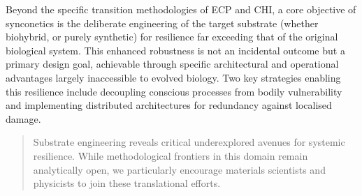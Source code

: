 \documentclass[10pt]{article}
\begin{document}
\begin{sloppypar}
  Beyond the specific transition methodologies of ECP and CHI, a core objective of synconetics is the deliberate engineering of the target substrate (whether biohybrid, or purely synthetic) for resilience far exceeding that of the original biological system. This enhanced robustness is not an incidental outcome but a primary design goal, achievable through specific architectural and operational advantages largely inaccessible to evolved biology. Two key strategies enabling this resilience include decoupling conscious processes from bodily vulnerability and implementing distributed architectures for redundancy against localised damage.


  \begin{quote}
    Substrate engineering reveals critical underexplored avenues for systemic resilience. While methodological frontiers in this domain remain analytically open, we particularly encourage materials scientists and physicists to join these translational efforts.
  \end{quote}


\end{sloppypar}
\end{document}
